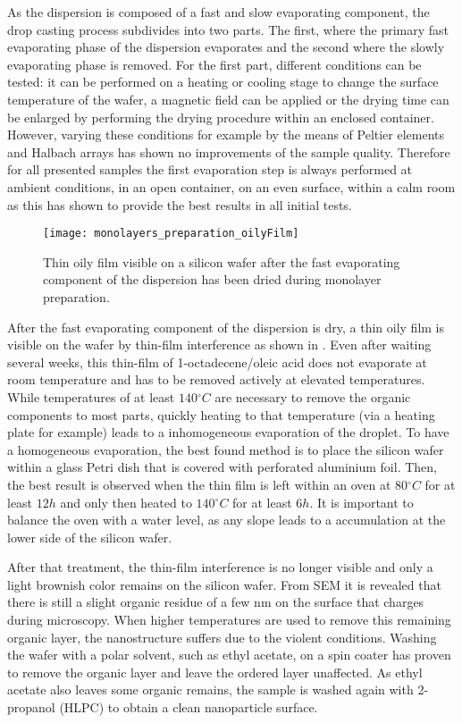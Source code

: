 \documentclass[\main/dresen_thesis.tex]{subfiles}
\begin{document}
  As the dispersion is composed of a fast and slow evaporating component, the drop casting process subdivides into two parts.
  The first, where the primary fast evaporating phase of the dispersion evaporates and the second where the slowly evaporating phase is removed.
  For the first part, different conditions can be tested: it can be performed on a heating or cooling stage to change the surface temperature of the wafer, a magnetic field can be applied or the drying time can be enlarged by performing the drying procedure within an enclosed container.
  However, varying these conditions for example by the means of Peltier elements and Halbach arrays has shown no improvements of the sample quality.
  Therefore for all presented samples the first evaporation step is always performed at ambient conditions, in an open container, on an even surface, within a calm room as this has shown to provide the best results in all initial tests.

  \begin{figure}[tb]
    \centering
    \texttt{[image: monolayers\_preparation\_oilyFilm]}
    \caption{\label{fig:monolayers:preparation:dryingConditions:oilyFilm}Thin oily film visible on a silicon wafer after the fast evaporating component of the dispersion has been dried during monolayer preparation.}
  \end{figure}
  After the fast evaporating component of the dispersion is dry, a thin oily film is visible on the wafer by thin-film interference as shown in .
  Even after waiting several weeks, this thin-film of 1-octadecene/oleic acid does not evaporate at room temperature and has to be removed actively at elevated temperatures.
  While temperatures of at least $140 \unit{^\circ C}$ are necessary to remove the organic components to most parts, quickly heating to that temperature (via a heating plate for example) leads to a inhomogeneous evaporation of the droplet.
  To have a homogeneous evaporation, the best found method is to place the silicon wafer within a glass Petri dish that is covered with perforated aluminium foil.
  Then, the best result is observed when the thin film is left within an oven at $80 \unit{^\circ C}$ for at least $12\unit{h}$ and only then heated to $140 \unit{^\circ C}$ for at least $6\unit{h}$.
  It is important to balance the oven with a water level, as any slope leads to a accumulation at the lower side of the silicon wafer.

  After that treatment, the thin-film interference is no longer visible and only a light brownish color remains on the silicon wafer.
  From SEM it is revealed that there is still a slight organic residue of a few nm on the surface that charges during microscopy.
  When higher temperatures are used to remove this remaining organic layer, the nanostructure suffers due to the violent conditions.
  Washing the wafer with a polar solvent, such as ethyl acetate, on a spin coater has proven to remove the organic layer and leave the ordered layer unaffected.
  As ethyl acetate also leaves some organic remains, the sample is washed again with 2-propanol (HLPC) to obtain a clean nanoparticle surface.
\end{document}
